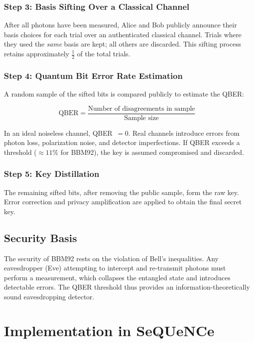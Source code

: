 \documentclass[12pt,oneside,letterpaper,english]{article}
\begin{document}
\subsubsection{Step 3: Basis Sifting Over a Classical Channel}

After all photons have been measured, Alice and Bob publicly announce their basis choices for each trial over an authenticated classical channel. Trials where they used the \emph{same} basis are kept; all others are discarded. This sifting process retains approximately $\frac{1}{2}$ of the total trials.

\subsubsection{Step 4: Quantum Bit Error Rate Estimation}

A random sample of the sifted bits is compared publicly to estimate the QBER:

\begin{equation}
\text{QBER} = \frac{\text{Number of disagreements in sample}}{\text{Sample size}}
\end{equation}

In an ideal noiseless channel, QBER~$= 0$. Real channels introduce errors from photon loss, polarization noise, and detector imperfections. If QBER exceeds a threshold ($\approx 11\%$ for BBM92), the key is assumed compromised and discarded.

\subsubsection{Step 5: Key Distillation}

The remaining sifted bits, after removing the public sample, form the raw key. Error correction and privacy amplification are applied to obtain the final secret key.

\subsection{Security Basis}

The security of BBM92 rests on the violation of Bell's inequalities. Any eavesdropper (Eve) attempting to intercept and re-transmit photons must perform a measurement, which collapses the entangled state and introduces detectable errors. The QBER threshold thus provides an information-theoretically sound eavesdropping detector.

\section{Implementation in SeQUeNCe}
\end{document}
